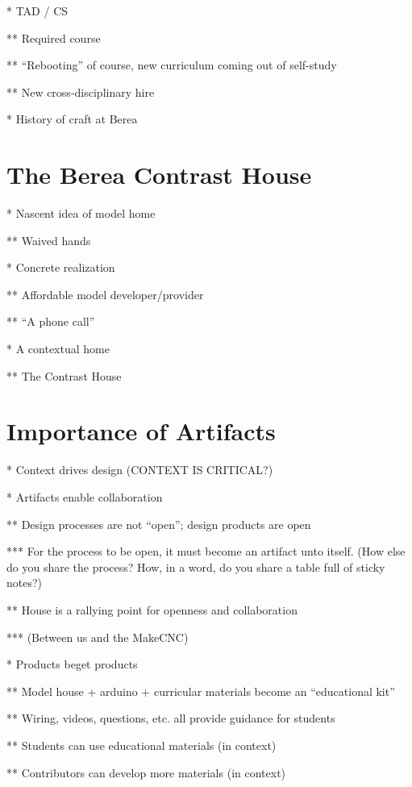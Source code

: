 * TAD / CS

** Required course

** ``Rebooting'' of course, new curriculum coming out of self-study

** New cross-disciplinary hire

* History of craft at Berea

\section{The Berea Contrast House}

* Nascent idea of model home

** Waived hands

* Concrete realization

** Affordable model developer/provider

** ``A phone call''

* A contextual home

** The Contrast House

\section{Importance of Artifacts}

* Context drives design (CONTEXT IS CRITICAL?)

* Artifacts enable collaboration

** Design processes are not ``open''; design products are open

*** For the process to be open, it must become an artifact unto itself. (How else do you share the process? How, in a word, do you share a table full of sticky notes?)

** House is a rallying point for openness and collaboration

*** (Between us and the MakeCNC)

* Products beget products

** Model house + arduino + curricular materials become an ``educational kit''

** Wiring, videos, questions, etc. all provide guidance for students

** Students can use educational materials (in context)

** Contributors can develop more materials (in context)
